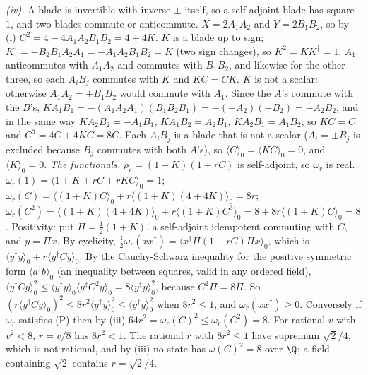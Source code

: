 \emph{(iv).} A blade is invertible with inverse $\pm$ itself, so a self-adjoint blade has square $1$, and two blades commute or anticommute. $X = 2A_{1}A_{2}$ and $Y = 2B_{1}B_{2}$, so by (i) $C^{2} = 4 - 4A_{1}A_{2}B_{1}B_{2} = 4 + 4K$. $K$ is a blade up to sign; $K^{\dagger} = -B_{2}B_{1}A_{2}A_{1} = -A_{1}A_{2}B_{1}B_{2} = K$ (two sign changes), so $K^{2} = KK^{\dagger} = 1$. $A_{1}$ anticommutes with $A_{1}A_{2}$ and commutes with $B_{1}B_{2}$, and likewise for the other three, so each $A_{i}B_{j}$ commutes with $K$ and $KC = CK$. $K$ is not a scalar: otherwise $A_{1}A_{2} = \pm B_{1}B_{2}$ would commute with $A_{1}$. Since the $A$'s commute with the $B$'s, $KA_{1}B_{1} = -(A_{1}A_{2}A_{1})(B_{1}B_{2}B_{1}) = -(-A_{2})(-B_{2}) = -A_{2}B_{2}$, and in the same way $KA_{2}B_{2} = -A_{1}B_{1}$, $KA_{1}B_{2} = A_{2}B_{1}$, $KA_{2}B_{1} = A_{1}B_{2}$; so $KC = C$ and $C^{3} = 4C + 4KC = 8C$. Each $A_{i}B_{j}$ is a blade that is not a scalar ($A_{i} = \pm B_{j}$ is excluded because $B_{j}$ commutes with both $A$'s), so $\langle C\rangle_{0} = \langle KC\rangle_{0} = 0$, and $\langle K\rangle_{0} = 0$. \emph{The functionals.} $\rho_{r} = (1 + K)(1 + rC)$ is self-adjoint, so $\omega_{r}$ is real. $\omega_{r}(1) = \langle 1 + K + rC + rKC\rangle_{0} = 1$; $\omega_{r}(C) = \langle(1 + K)C\rangle_{0} + r\langle(1 + K)(4 + 4K)\rangle_{0} = 8r$; $\omega_{r}(C^{2}) = \langle(1 + K)(4 + 4K)\rangle_{0} + r\langle(1 + K)C^{3}\rangle_{0} = 8 + 8r\langle(1 + K)C\rangle_{0} = 8$. Positivity: put $\Pi = \tfrac12(1 + K)$, a self-adjoint idempotent commuting with $C$, and $y = \Pi x$. By cyclicity, $\tfrac12\omega_{r}(xx^{\dagger}) = \langle x^{\dagger}\Pi(1 + rC)\Pi x\rangle_{0}$, which is $\langle y^{\dagger}y\rangle_{0} + r\langle y^{\dagger}Cy\rangle_{0}$. By the Cauchy-Schwarz inequality for the positive symmetric form $\langle a^{\dagger}b\rangle_{0}$ (an inequality between squares, valid in any ordered field), $\langle y^{\dagger}Cy\rangle_{0}^{2} \le \langle y^{\dagger}y\rangle_{0}\langle y^{\dagger}C^{2}y\rangle_{0} = 8\langle y^{\dagger}y\rangle_{0}^{2}$, because $C^{2}\Pi = 8\Pi$. So $(r\langle y^{\dagger}Cy\rangle_{0})^{2} \le 8r^{2}\langle y^{\dagger}y\rangle_{0}^{2} \le \langle y^{\dagger}y\rangle_{0}^{2}$ when $8r^{2} \le 1$, and $\omega_{r}(xx^{\dagger}) \ge 0$. Conversely if $\omega_{r}$ satisfies (P) then by (iii) $64r^{2} = \omega_{r}(C)^{2} \le \omega_{r}(C^{2}) = 8$. For rational $v$ with $v^{2} < 8$, $r = v/8$ has $8r^{2} < 1$. The rational $r$ with $8r^{2} \le 1$ have supremum $\sqrt{2}/4$, which is not rational, and by (iii) no state has $\omega(C)^{2} = 8$ over $\Q$; a field containing $\sqrt{2}$ contains $r = \sqrt{2}/4$.

